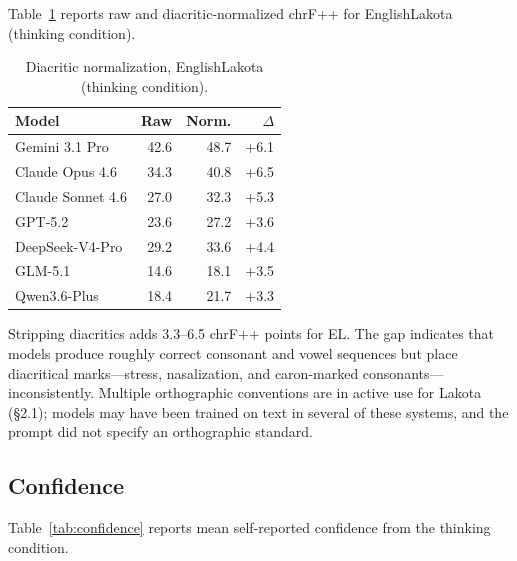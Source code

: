 \documentclass[11pt]{article}
\begin{document}
Table~\ref{tab:diacritic} reports raw and diacritic-normalized chrF++ for English\textrightarrow Lakota (thinking condition).

\begin{table}[t]
\centering\small
\begin{tabular}{@{}lrrr@{}}
\toprule
\textbf{Model} & \textbf{Raw} & \textbf{Norm.} & \textbf{$\Delta$} \\
\midrule
Gemini 3.1 Pro & 42.6 & 48.7 & +6.1 \\
Claude Opus 4.6 & 34.3 & 40.8 & +6.5 \\
Claude Sonnet 4.6 & 27.0 & 32.3 & +5.3 \\
GPT-5.2 & 23.6 & 27.2 & +3.6 \\
\midrule
DeepSeek-V4-Pro & 29.2 & 33.6 & +4.4 \\
GLM-5.1 & 14.6 & 18.1 & +3.5 \\
Qwen3.6-Plus & 18.4 & 21.7 & +3.3 \\
\bottomrule
\end{tabular}
\caption{Diacritic normalization, English\textrightarrow Lakota (thinking condition).}
\label{tab:diacritic}
\end{table}


Stripping diacritics adds 3.3--6.5 chrF++ points for E\textrightarrow L. The gap indicates that models produce roughly correct consonant and vowel sequences but place diacritical marks---stress, nasalization, and caron-marked consonants---inconsistently. Multiple orthographic conventions are in active use for Lakota (\S2.1); models may have been trained on text in several of these systems, and the prompt did not specify an orthographic standard.

\subsection{Confidence}

Table~\ref{tab:confidence} reports mean self-reported confidence from the thinking condition.
\end{document}
